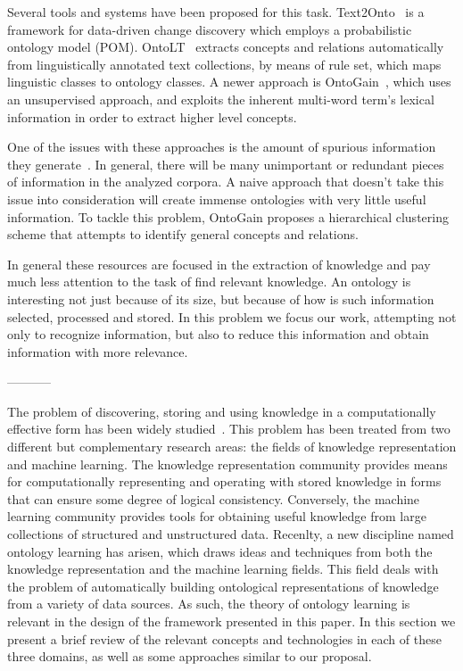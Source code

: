 Several tools and systems have been proposed for this task.
Text2Onto~\cite{cimiano2005text2onto} is a framework for
data-driven change discovery which employs a probabilistic
ontology model (POM).
OntoLT~\cite{buitelaar2004ontolt} extracts concepts and
relations automatically from linguistically annotated text collections,
by means of rule set, which maps linguistic classes to ontology classes.
A newer approach is OntoGain~\cite{drymonas2010unsupervised},
which uses an unsupervised approach,
and exploits the inherent multi-word term's lexical information
in order to extract higher level concepts.

One of the issues with these approaches is the amount of spurious
information they generate~\cite{Maimon:2015:OLT:2870689.2870690}.
In general, there will be many unimportant
or redundant pieces of information in the analyzed corpora. A naive
approach that doesn't take this issue into consideration will create
immense ontologies with very little useful information. To tackle
this problem, OntoGain proposes a hierarchical clustering scheme
that attempts to identify general concepts and relations.

In general these resources are focused in the extraction of knowledge and
pay much less attention to the task of find relevant knowledge.
An ontology is interesting not just because of its size, but
because of how is such information selected, processed and stored.
In this problem we focus our work, attempting not only
to recognize information, but also to reduce this information and obtain
information with more relevance.

-----------

The problem of discovering, storing and using knowledge in a computationally effective
form has been widely studied~\cite{mitchell2015never, ROSPOCHER2016132, cimiano2009ontology}.
This problem has been treated from two different but complementary research areas:
the fields of knowledge representation and machine learning.
The knowledge representation community provides means for
computationally representing and operating with stored knowledge in forms that
can ensure some degree of logical consistency.
Conversely, the machine learning community provides
tools for obtaining useful knowledge from large collections of structured and unstructured data.
Recenlty, a new discipline named ontology learning has arisen, which draws ideas
and techniques from both the knowledge representation and the machine learning fields.
This field deals with the problem of automatically building ontological representations
of knowledge from a variety of data sources. As such, the theory of ontology learning
is relevant in the design of the framework presented in this paper.
In this section we present a brief review of the relevant concepts and technologies
in each of these three domains, as well as some approaches similar to our proposal.

